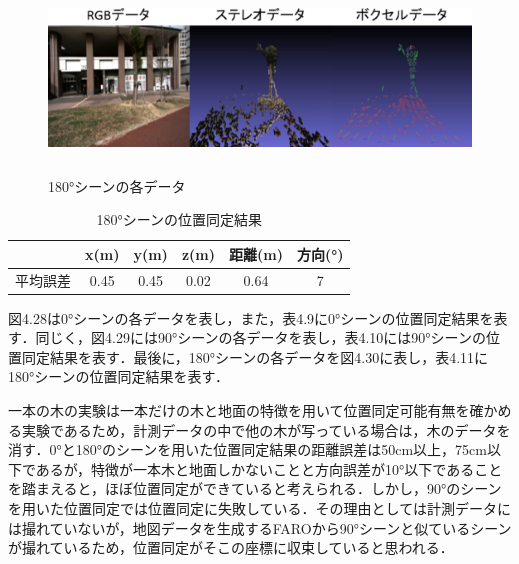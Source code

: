 \begin{figure}[htbp]
  \begin{center}
   \includegraphics[height=50mm]{figure/180°シーンの各データ.eps}
   \caption{180°シーンの各データ}
   \label{180°シーンの各データ}
  \end{center}
\end{figure}
%
\begin{table}[htbp]
\begin{center}
\begin{tabular}{|c|c|c|c|c|c|} \hline
\  & x(m) & y(m) & z(m) & 距離(m) & 方向(°)\\ \hline
平均誤差 & 0.45 & 0.45 & 0.02 & 0.64 & 7\\ \hline
\end{tabular}
\caption{180°シーンの位置同定結果}
\end{center}
\end{table}
%
\par
図4.28は0°シーンの各データを表し，また，表\hspace{-2mm}4.9に0°シーンの位置同定結果を表す．同じく，図\hspace{-2mm}4.29には90°シーンの各データを表し，表\hspace{-2mm}4.10には90°シーンの位置同定結果を表す．最後に，\hspace{-2mm}180°シーンの各データを図4.30に表し，表4.11に180°シーンの位置同定結果を表す．\par
一本の木の実験は一本だけの木と地面の特徴を用いて位置同定可能有無を確かめる実験であるため，計測データの中で他の木が写っている場合は，木のデータを消す．0°と\hspace{-2mm}180°のシーンを用いた位置同定結果の距離誤差は50cm以上，75cm以下であるが，特徴が一本木と地面しかないことと方向誤差が10°以下であることを踏まえると，ほぼ位置同定ができていると考えられる．しかし，90°のシーンを用いた位置同定では位置同定に失敗している．その理由としては計測データには撮れていないが，地図データを生成するFAROから90°シーンと似ているシーンが撮れているため，位置同定がそこの座標に収束していると思われる．